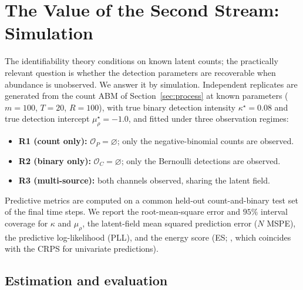 \documentclass[preprint,12pt]{elsarticle}
\theoremstyle{definition}
\newcommand{\OC}{\mathcal{O}_C}
\newcommand{\OP}{\mathcal{O}_P}
\begin{document}
\section{The Value of the Second Stream: Simulation}
\label{sec:voi}

The identifiability theory conditions on known latent counts; the
practically relevant question is whether the detection parameters are
recoverable when abundance is unobserved. We answer it by simulation.
Independent replicates are generated from the count ABM of
Section~\ref{sec:process} at known parameters ($m=100$, $T=20$, $R=100$),
with true binary detection intensity $\kappa^\star=0.08$ and true detection
intercept $\mu_\rho^\star=-1.0$, and fitted under three observation
regimes:
\begin{itemize}[leftmargin=1.5em]
  \item \textbf{R1 (count only):} $\OP=\varnothing$; only the
    negative-binomial counts are observed.
  \item \textbf{R2 (binary only):} $\OC=\varnothing$; only the Bernoulli
    detections are observed.
  \item \textbf{R3 (multi-source):} both channels observed, sharing the
    latent field.
\end{itemize}
Predictive metrics are computed on a common held-out count-and-binary test
set of the final time steps. We report the root-mean-square error and
$95\%$ interval coverage for $\kappa$ and $\mu_\rho$, the latent-field mean
squared prediction error ($N$ MSPE), the predictive log-likelihood (PLL),
and the energy score (ES; \citealp{gneiting2007}, which coincides with the
CRPS for univariate predictions).

\subsection{Estimation and evaluation}
\label{sec:voi-methods}
\end{document}
